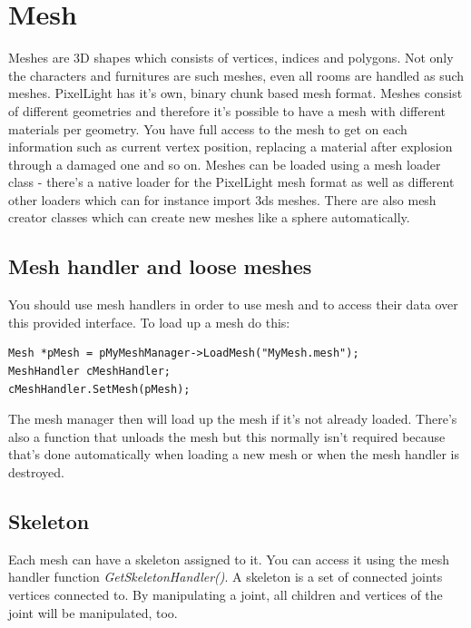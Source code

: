 \section{Mesh}
Meshes are 3D shapes which consists of vertices, indices and polygons. Not only the characters and furnitures are such meshes, even all rooms are handled as such meshes. PixelLight has it's own, binary chunk based mesh format. Meshes consist of different geometries and therefore it's possible to have a mesh with different materials per geometry. You have full access to the mesh to get on each information such as current vertex position, replacing a material after explosion through a damaged one and so on. Meshes can be loaded using a mesh loader class - there's a native loader for the PixelLight mesh format as well as different other loaders which can for instance import 3ds meshes. There are also mesh creator classes which can create new meshes like a sphere automatically.




\subsection{Mesh handler and loose meshes}
You should use mesh handlers in order to use mesh and to access their data over this provided interface. To load up a mesh do this:

\begin{lstlisting}[caption=Loading a mesh]
Mesh *pMesh = pMyMeshManager->LoadMesh("MyMesh.mesh");
MeshHandler cMeshHandler;
cMeshHandler.SetMesh(pMesh);
\end{lstlisting}

The mesh manager then will load up the mesh if it's not already loaded. There's also a function that unloads the mesh but this normally isn't required because that's done automatically when loading a new mesh or when the mesh handler is destroyed.




\subsection{Skeleton}
Each mesh can have a skeleton assigned to it. You can access it using the mesh handler function \emph{GetSkeletonHandler()}. A skeleton is a set of connected joints vertices connected to. By manipulating a joint, all children and vertices of the joint will be manipulated, too.

